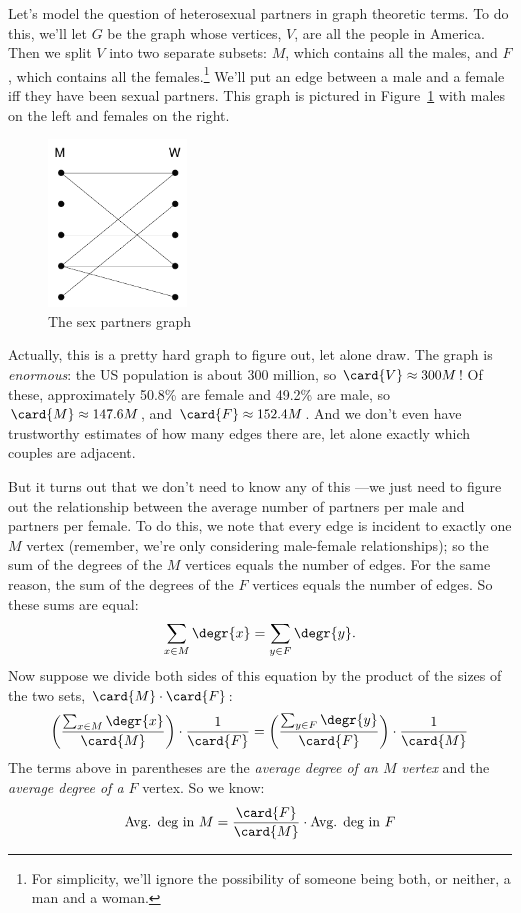 
Let's model the question of heterosexual partners in graph theoretic
terms.  To do this, we'll let $G$ be the graph whose vertices, $V$, are
all the people in America.  Then we split $V$ into two separate subsets:
$M$, which contains all the males, and $F$, which contains all the
females.\footnote{For simplicity, we'll ignore the possibility of someone
  being both, or neither, a man and a woman.}  We'll put an edge between a
male and a female iff they have been sexual partners.  This graph is
pictured in Figure~\ref{fig:partners} with males on the left and females on
the right.

\begin{figure}[htbp]
\centering \includegraphics[height=1.75in]{figures/sex-edges.pdf}
\caption{The sex partners graph}
\label{fig:partners}
\end{figure}

Actually, this is a pretty hard graph to figure out, let alone draw.  The
graph is \emph{enormous}: the US population is about 300 million, so
$\card{V} \approx 300M$!  Of these, approximately 50.8\% are female and
49.2\% are male, so $\card{M} \approx 147.6M$, and $\card{F} \approx
152.4M$.  And we don't even have trustworthy estimates of how many edges
there are, let alone exactly which couples are adjacent.

But it turns out that we don't need to know any of this ---we just need to
figure out the relationship between the average number of partners per
male and partners per female.  To do this, we note that every edge is
incident to exactly one $M$ vertex (remember, we're only considering
male-female relationships); so the sum of the degrees of the $M$ vertices
equals the number of edges.  For the same reason, the sum of the degrees
of the $F$ vertices equals the number of edges.  So these sums are equal:
%
\[
\sum_{x \in M} \degr{x} = \sum_{y \in F} \degr{y}.
\]
%
Now suppose we divide both sides of this equation by the product of
the sizes of the two sets, $\card{M} \cdot \card{F}$:
%
\[
\left(\frac{\sum_{x \in M} \degr{x}}{\card{M}}\right) \cdot \frac{1}{\card{F}} =
\left(\frac{\sum_{y \in F} \degr{y}}{\card{F}}\right) \cdot \frac{1}{\card{M}}
\]
%
The terms above in parentheses are the \textit{average degree of an $M$
vertex} and the \textit{average degree of a $F$} vertex.  So we know:
\[
\text{Avg. deg in $M$} = \frac{\card{F}}{\card{M}} \cdot \text{Avg. deg in $F$}
\]

